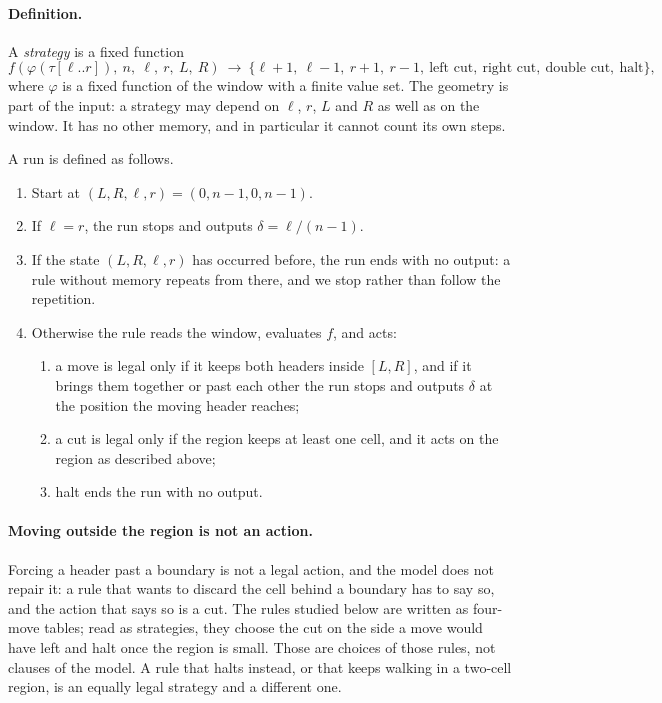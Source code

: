 \documentclass[11pt]{article}
\begin{document}
\paragraph{Definition.} A \emph{strategy} is a fixed function
\[
f(\varphi(\tau[\ell..r]),\ n,\ \ell,\ r,\ L,\ R)\ \longrightarrow\
\{\ell{+}1,\ \ell{-}1,\ r{+}1,\ r{-}1,\ \text{left cut},\ \text{right cut},\ \text{double cut},\ \text{halt}\},
\]
where $\varphi$ is a fixed function of the window with a finite value set. The geometry is part of the
input: a strategy may depend on $\ell$, $r$, $L$ and $R$ as well as on the window. It has no other
memory, and in particular it cannot count its own steps.

A run is defined as follows.
\begin{enumerate}
\item Start at $(L,R,\ell,r)=(0,n-1,0,n-1)$.
\item If $\ell=r$, the run stops and outputs $\delta=\ell/(n-1)$.
\item If the state $(L,R,\ell,r)$ has occurred before, the run ends with no output: a rule without
memory repeats from there, and we stop rather than follow the repetition.
\item Otherwise the rule reads the window, evaluates $f$, and acts:
\begin{enumerate}
\item a move is legal only if it keeps both headers inside $[L,R]$, and if it brings them together or
past each other the run stops and outputs $\delta$ at the position the moving header reaches;
\item a cut is legal only if the region keeps at least one cell, and it acts on the region as
described above;
\item halt ends the run with no output.
\end{enumerate}
\end{enumerate}

\paragraph{Moving outside the region is not an action.} Forcing a header past a boundary is not a legal
action, and the model does not repair it: a rule that wants to discard the cell behind a boundary has
to say so, and the action that says so is a cut. The rules studied below are written as four-move
tables; read as strategies, they choose the cut on the side a move would have left and halt once the
region is small. Those are choices of those rules, not clauses of the model. A rule that halts
instead, or that keeps walking in a two-cell region, is an equally legal strategy and a different one.
\end{document}
